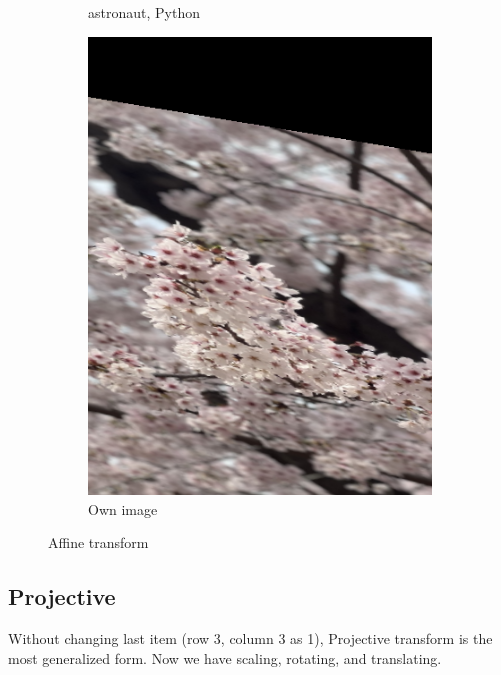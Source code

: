 \documentclass{article}
\begin{document}
\begin{figure}[!ht]
\begin{subfigure}{0.267\textwidth}
        \caption{astronaut, Python}
    \end{subfigure}
    \begin{subfigure}{0.2\textwidth}
        \includegraphics[width=\textwidth]{./fig/affine_cb.png}
        \caption{Own image}
    \end{subfigure}
    \caption{Affine transform}
\end{figure}

\newpage
\subsection{Projective}
Without changing last item (row 3, column 3 as 1), Projective transform is the most generalized form.
Now we have scaling, rotating, and translating.  
\end{document}

